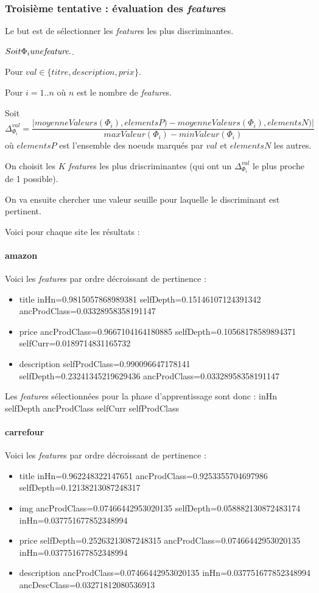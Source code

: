 \documentclass{article}
\begin{document}
\subsubsection{Troisième tentative : évaluation des \emph{feature}s}
Le but est de sélectionner les \emph{feature}s les plus discriminantes.

$Soit \Phi_i une \emph{feature}.$.

Pour $val \in \{titre, description, prix\}$.

Pour $i = 1..n$ où $n$ est le nombre de \emph{feature}s.

Soit \[  \Delta^{val}_{\Phi_i}= \frac{|moyenneValeurs(\Phi_i), elementsP) - moyenneValeurs(\Phi_i), elementsN)|}{maxValeur(\Phi_i) - minValeur(\Phi_i)}\]
où $elementsP$ est l'ensemble des noeuds marqués par $val$ et $elementsN$ les autres.

On choisit les $K$ \emph{feature}s les plus driscriminantes (qui ont un $\Delta^{val}_{\Phi_i}$ le plus proche de 1 possible).

On va ensuite chercher une valeur seuille pour laquelle le discriminant est pertinent.

Voici pour chaque site les résultats :

\paragraph{amazon}
Voici les \emph{feature}s par ordre décroissant de pertinence :
\begin{itemize}
    \item{title} inHn=0.9815057868989381 selfDepth=0.15146107124391342 ancProdClass=0.03328958358191147
    \item{price} ancProdClass=0.9667104164180885 selfDepth=0.10568178589894371 selfCurr=0.0189714831165732
    \item{description} selfProdClass=0.990096647178141 selfDepth=0.23241345219629436 ancProdClass=0.03328958358191147
\end{itemize}

Les \emph{feature}s sélectionnées pour la phase d'apprentissage sont donc :
inHn selfDepth ancProdClass selfCurr selfProdClass

\paragraph{carrefour}
Voici les \emph{feature}s par ordre décroissant de pertinence :
\begin{itemize}
    \item{title} inHn=0.962248322147651 ancProdClass=0.9253355704697986 selfDepth=0.12138213087248317
    \item{img} ancProdClass=0.07466442953020135 selfDepth=0.058882130872483174 inHn=0.037751677852348994
    \item{price} selfDepth=0.25263213087248315 ancProdClass=0.07466442953020135 inHn=0.037751677852348994
    \item{description} ancProdClass=0.07466442953020135 inHn=0.037751677852348994 ancDescClass=0.03271812080536913
\end{itemize}
\end{document}
